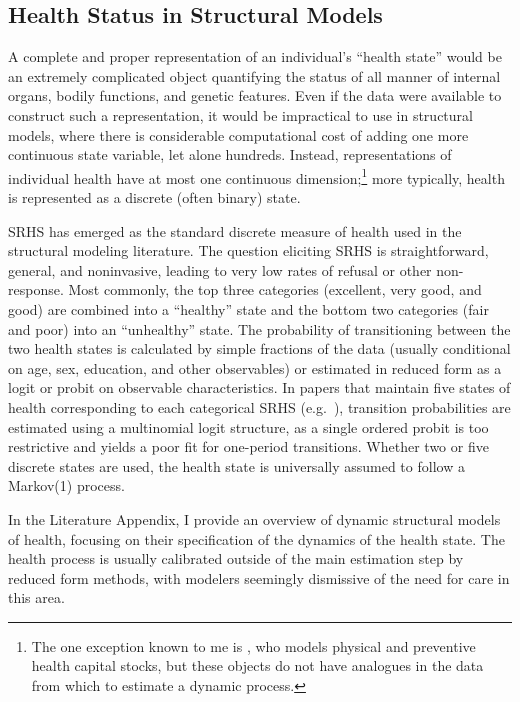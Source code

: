 \documentclass[12pt,pdftex,letterpaper]{article}
\begin{document}
\subsection{Health Status in Structural Models}

A complete and proper representation of an individual's ``health state'' would be an extremely complicated object quantifying the status of all manner of internal organs, bodily functions, and genetic features.  Even if the data were available to construct such a representation, it would be impractical to use in structural models, where there is considerable computational cost of adding one more continuous state variable, let alone hundreds.  Instead, representations of individual health have at most one continuous dimension;\footnote{The one exception known to me is \cite{Ozkan17}, who models physical and preventive health capital stocks, but these objects do not have analogues in the data from which to estimate a dynamic process.} more typically, health is represented as a discrete (often binary) state.

SRHS has emerged as the standard discrete measure of health used in the structural modeling literature.  The question eliciting SRHS is straightforward, general, and noninvasive, leading to very low rates of refusal or other non-response.  Most commonly, the top three categories (excellent, very good, and good) are combined into a ``healthy'' state and the bottom two categories (fair and poor) into an ``unhealthy'' state.  The probability of transitioning between the two health states is calculated by simple fractions of the data (usually conditional on age, sex, education, and other observables) or estimated in reduced form as a logit or probit on observable characteristics.  In papers that maintain five states of health corresponding to each categorical SRHS (e.g.\ \cite{Khwaja10}), transition probabilities are estimated using a multinomial logit structure, as a single ordered probit is too restrictive and yields a poor fit for one-period transitions.  Whether two or five discrete states are used, the health state is universally assumed to follow a Markov(1) process.

In the Literature Appendix, I provide an overview of dynamic structural models of health, focusing on their specification of the dynamics of the health state.  The health process is usually calibrated outside of the main estimation step by reduced form methods, with modelers seemingly dismissive of the need for care in this area.
\end{document}
